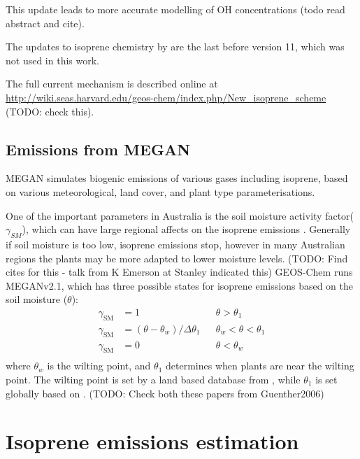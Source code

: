     This update leads to more accurate modelling of OH concentrations \citep{Mao2012} (todo read abstract and cite).
    
    The updates to isoprene chemistry by \citet{Mao2013} are the last before version 11, which was not used in this work.

    The full current mechanism is described online at \url{http://wiki.seas.harvard.edu/geos-chem/index.php/New_isoprene_scheme} (TODO: check this).
    
  \subsection{Emissions from MEGAN}
    MEGAN simulates biogenic emissions of various gases including isoprene, based on various meteorological, land cover, and plant type parameterisations.
    
    One of the important parameters in Australia is the soil moisture activity factor($\gamma_{SM}$), which can have large regional affects on the isoprene emissions \citep{Sindelarova2014,Bauwens2016}.
    Generally if soil moisture is too low, isoprene emissions stop, however in many Australian regions the plants may be more adapted to lower moisture levels. (TODO: Find cites for this - talk from K Emerson at Stanley indicated this)
    GEOS-Chem runs MEGANv2.1, which has three possible states for isoprene emissions based on the soil moisture ($\theta$):
    \begin{align*}
      \gamma_\mathrm{SM} & = 1 && \theta > \theta_1 \\
      \gamma_\mathrm{SM} & = (\theta-\theta_w)/\Delta\theta_1  && \theta_w < \theta < \theta_1 \\
      \gamma_\mathrm{SM} & = 0 && \theta < \theta_w \\
    \end{align*}
    where $\theta_w$ is the wilting point, and $\theta_1$ determines when plants are near the wilting point.
    The wilting point is set by a land based database from \citet{Chen2001}, while $\theta_1$ is set globally based on \citet{Pegoraro2004}. (TODO: Check both these papers  from Guenther2006)

\section{Isoprene emissions estimation}
\label{ch_isop:sec:IsopreneEmissions}

